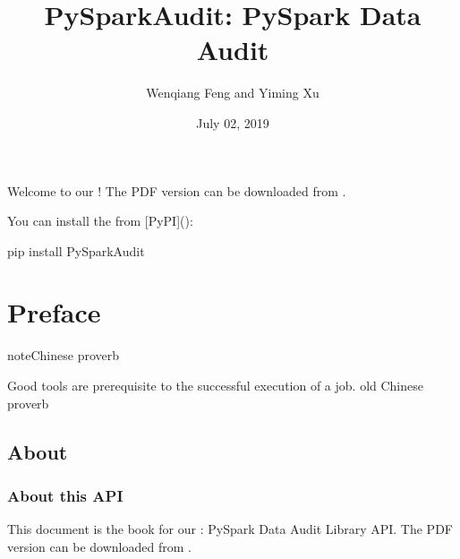 \documentclass[letterpaper,12pt,english]{sphinxmanual}
\title{PySparkAudit: PySpark Data Audit}
\date{July 02, 2019}
\author{Wenqiang Feng and Yiming Xu}
\begin{document}
\pagestyle{empty}
\maketitle
\pagestyle{plain}
\sphinxtableofcontents
\pagestyle{normal}
\label{\detokenize{index::doc}}\label{\detokenize{index:index}}\begin{quote}

\begin{figure}[htbp]
\centering

\noindent{}
\end{figure}
\end{quote}

Welcome to our ! The PDF version can be downloaded from .

You can install the  from {[}PyPI{]}():

%
\begin{sphinxVerbatim}[commandchars=\\\{\}]
pip install PySparkAudit
\end{sphinxVerbatim}




\chapter{Preface}
\label{\detokenize{preface:preface}}\label{\detokenize{preface:id1}}\label{\detokenize{preface::doc}}
\begin{sphinxadmonition}{note}{Chinese proverb}

Good tools are prerequisite to the successful execution of a job. \textendash{} old Chinese proverb
\end{sphinxadmonition}


\section{About}
\label{\detokenize{preface:about}}

\subsection{About this API}
\label{\detokenize{preface:about-this-api}}
This document is the  book for our : PySpark Data Audit Library  API. The PDF version can be downloaded from . 
\end{document}
